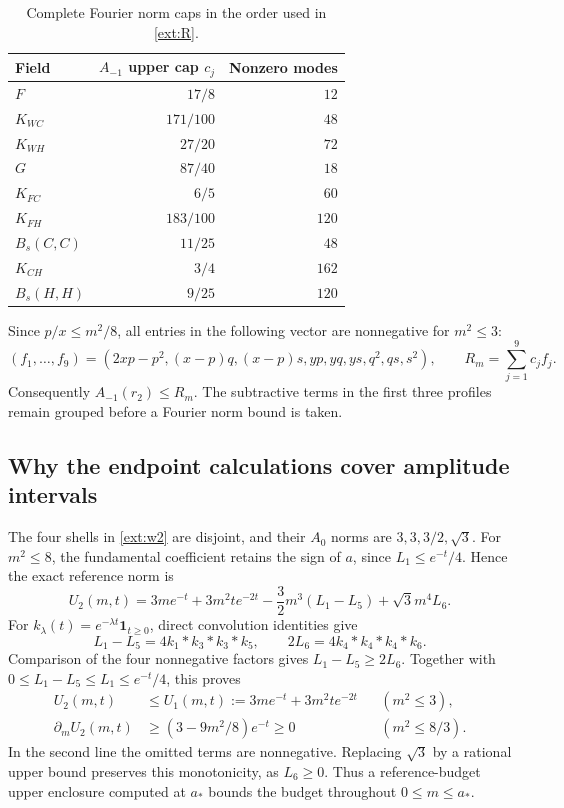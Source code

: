 \begin{table}[htbp]
\centering
\begin{tabular}{lrr}
\hline
Field & $A_{-1}$ upper cap $c_j$ & Nonzero modes\\
\hline
$F$ & $17/8$ & $12$\\
$K_{WC}$ & $171/100$ & $48$\\
$K_{WH}$ & $27/20$ & $72$\\
$G$ & $87/40$ & $18$\\
$K_{FC}$ & $6/5$ & $60$\\
$K_{FH}$ & $183/100$ & $120$\\
$B_s(C,C)$ & $11/25$ & $48$\\
$K_{CH}$ & $3/4$ & $162$\\
$B_s(H,H)$ & $9/25$ & $120$\\
\hline
\end{tabular}
\caption{Complete Fourier norm caps in the order used in \eqref{ext:R}.}
\label{ext:caps}
\end{table}

Since $p/x\le m^2/8$, all entries in the following vector are nonnegative
for $m^2\le3$:
\begin{equation}
 (f_1,\ldots,f_9)=
 (2xp-p^2,(x-p)q,(x-p)s,yp,yq,ys,q^2,qs,s^2),
 \qquad R_m=\sum_{j=1}^9c_jf_j.
 \label{ext:R}
\end{equation}
Consequently $A_{-1}(r_2)\le R_m$. The subtractive terms in the first three
profiles remain grouped before a Fourier norm bound is taken.

\subsection{Why the endpoint calculations cover amplitude intervals}
\label{ext:monotonicity}

The four shells in \eqref{ext:w2} are disjoint, and their $A_0$ norms are
$3,3,3/2,\sqrt3$. For $m^2\le8$, the fundamental coefficient retains the
sign of $a$, since $L_1\le e^{-t}/4$. Hence the exact reference norm is
\begin{equation}
 U_2(m,t)=3me^{-t}+3m^2te^{-2t}
      -\frac32m^3(L_1-L_5)+\sqrt3m^4L_6.
 \label{ext:U2}
\end{equation}
For $k_\lambda(t)=e^{-\lambda t}\mathbf1_{t\ge0}$, direct convolution
identities give
\[
 L_1-L_5=4k_1*k_3*k_3*k_5,\qquad
 2L_6=4k_4*k_4*k_4*k_6.
\]
Comparison of the four nonnegative factors gives $L_1-L_5\ge2L_6$.
Together with $0\le L_1-L_5\le L_1\le e^{-t}/4$, this proves
\begin{align}
 U_2(m,t)&\le U_1(m,t):=3me^{-t}+3m^2te^{-2t}
                   &&(m^2\le3),\label{ext:U1}\\
 \partial_mU_2(m,t)&\ge(3-9m^2/8)e^{-t}\ge0
                   &&(m^2\le8/3).
 \label{ext:Umonotone}
\end{align}
In the second line the omitted terms are nonnegative. Replacing $\sqrt3$
by a rational upper bound preserves this monotonicity, as $L_6\ge0$.
Thus a reference-budget upper enclosure computed at $a_*$ bounds the
budget throughout $0\le m\le a_*$.

